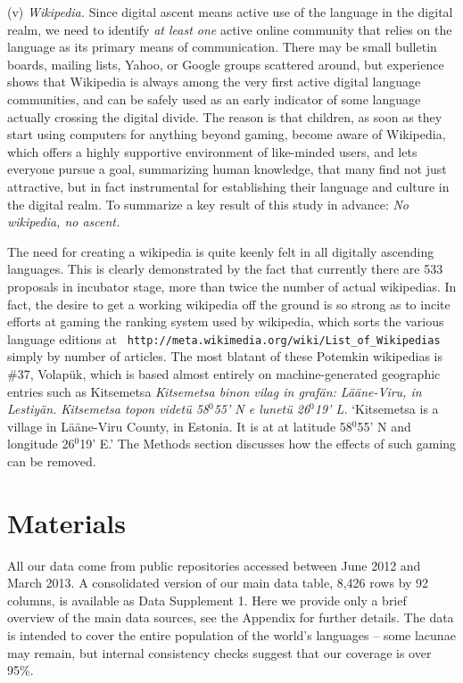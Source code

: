 \documentclass[10pt]{article}
\begin{document}
\medskip
(v) {\it Wikipedia.} Since digital {\color{black} ascent} means active use of the language
in the digital realm, we need to identify {\it at least one} active online community
that relies on the language as its primary means of communication. There may
be small bulletin boards, mailing lists, Yahoo, or Google groups scattered
around, but experience shows that Wikipedia is always among the very first
active digital language communities, and can be safely used as an early
indicator of some language actually crossing the digital divide. The reason is
that children, as soon as they start using computers for anything beyond
gaming, become aware of Wikipedia, which offers a highly supportive
environment of like-minded users, and lets everyone pursue a goal, summarizing
human knowledge, that many find not just attractive, but in fact instrumental
for establishing their language and culture in the digital realm. To summarize
a key result of this study in advance: {\it No wikipedia, no {\color{black} ascent}.}

The need for creating a wikipedia is quite keenly felt in all digitally
{\color{black} ascending} languages. This is clearly demonstrated by the fact that currently
there are 533 proposals in incubator stage, more than twice the number of
actual wikipedias.  In fact, the desire to get a working wikipedia off the
ground is so strong as to incite efforts at gaming the ranking system used by
wikipedia, which sorts the various language editions at {\tt
  http://meta.wikimedia.org/wiki/List\_of\_Wikipedias} simply by number of
articles. The most blatant of these Potemkin wikipedias is \#37, Volap\"{u}k,
which is based almost entirely on machine-generated geographic entries such as
{\sc Kitsemetsa} {\it Kitsemetsa binon vilag in graf\"an: L\"a\"ane-Viru, in
  Lestiy\"an. Kitsemetsa topon videt\"u 58$^0$55' N e lunet\"u 26$^0$19' L.}
{\color{black} `Kitsemetsa is a village in L\"a\"ane-Viru County, in Estonia. It
  is at at latitude 58$^0$55' N and longitude 26$^0$19' E.' The Methods
  section discusses how  the effects of   such gaming can be removed.}

\section*{Materials}

All our data come from public repositories accessed between June 2012 and
March 2013. A consolidated version of our main data table, 8,426 rows by 92
columns, is available as Data Supplement 1. {\color{black} Here we provide only
  a brief overview of the main data sources, see the Appendix for further
  details. The data is intended to cover the entire population of the world's
  languages -- some lacunae may remain, but internal consistency checks
  suggest that our coverage is over 95\%.}
\end{document}
